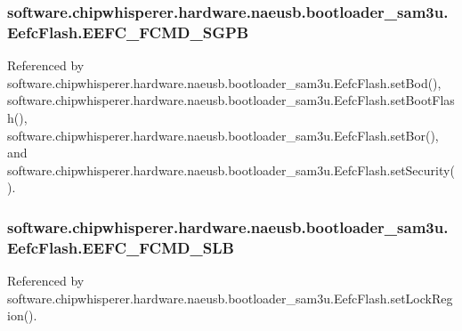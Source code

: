 \subsubsection[{E\+E\+F\+C\+\_\+\+F\+C\+M\+D\+\_\+\+S\+G\+P\+B}]{\setlength{\rightskip}{0pt plus 5cm}software.\+chipwhisperer.\+hardware.\+naeusb.\+bootloader\+\_\+sam3u.\+Eefc\+Flash.\+E\+E\+F\+C\+\_\+\+F\+C\+M\+D\+\_\+\+S\+G\+P\+B}\label{classsoftware_1_1chipwhisperer_1_1hardware_1_1naeusb_1_1bootloader__sam3u_1_1EefcFlash_a446018c934d09ce9dcf6bbee40708f81}


Referenced by software.\+chipwhisperer.\+hardware.\+naeusb.\+bootloader\+\_\+sam3u.\+Eefc\+Flash.\+set\+Bod(), software.\+chipwhisperer.\+hardware.\+naeusb.\+bootloader\+\_\+sam3u.\+Eefc\+Flash.\+set\+Boot\+Flash(), software.\+chipwhisperer.\+hardware.\+naeusb.\+bootloader\+\_\+sam3u.\+Eefc\+Flash.\+set\+Bor(), and software.\+chipwhisperer.\+hardware.\+naeusb.\+bootloader\+\_\+sam3u.\+Eefc\+Flash.\+set\+Security().

\hypertarget{classsoftware_1_1chipwhisperer_1_1hardware_1_1naeusb_1_1bootloader__sam3u_1_1EefcFlash_a0f150b2f87fb96f4c25e435fc8e1925b}{}
\subsubsection[{E\+E\+F\+C\+\_\+\+F\+C\+M\+D\+\_\+\+S\+L\+B}]{\setlength{\rightskip}{0pt plus 5cm}software.\+chipwhisperer.\+hardware.\+naeusb.\+bootloader\+\_\+sam3u.\+Eefc\+Flash.\+E\+E\+F\+C\+\_\+\+F\+C\+M\+D\+\_\+\+S\+L\+B}\label{classsoftware_1_1chipwhisperer_1_1hardware_1_1naeusb_1_1bootloader__sam3u_1_1EefcFlash_a0f150b2f87fb96f4c25e435fc8e1925b}


Referenced by software.\+chipwhisperer.\+hardware.\+naeusb.\+bootloader\+\_\+sam3u.\+Eefc\+Flash.\+set\+Lock\+Region().

\hypertarget{classsoftware_1_1chipwhisperer_1_1hardware_1_1naeusb_1_1bootloader__sam3u_1_1EefcFlash_ab4b74948aa2a5f3fbf945fc2f4ec0037}{}
